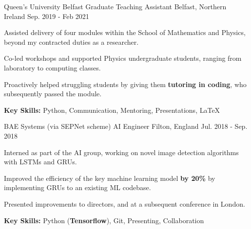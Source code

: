 \begin{cventries}
    
  \cventry
  	{Queen's University Belfast} %
    {Graduate Teaching Assistant} %
    {Belfast, Northern Ireland} %
    {Sep. 2019 - Feb 2021} %
    {
      \begin{cvitems} %
        \item {Assisted delivery of four modules within the School of Mathematics and Physics,  beyond my contracted duties as a researcher.}
        \item {Co-led workshops and supported Physics undergraduate students, ranging from laboratory to computing classes.}
        \item {Proactively helped struggling students by giving them \textbf{tutoring in coding}, who subsequently passed the module.}
        \item {\textbf{Key Skills:} Python, Communication, Mentoring, Presentations, \LaTeX} 
      \end{cvitems}
    }

  \cventry
  	{BAE Systems (via SEPNet scheme)} %
    {AI Engineer} %
    {Filton, England} %
    {Jul. 2018 - Sep. 2018} %
    {
      \begin{cvitems} %
        \item {Interned as part of the AI group, working on novel image detection algorithms with LSTMs and GRUs.}
        \item {Improved the efficiency of the key machine learning model \textbf{by 20\%} by implementing GRUs to an existing ML codebase.}
        \item {Presented improvements to directors, and at a subsequent conference in London.}
        \item {\textbf{Key Skills:} Python (\textbf{Tensorflow}), Git, Presenting, Collaboration}
      \end{cvitems}
    }


\end{cventries}


